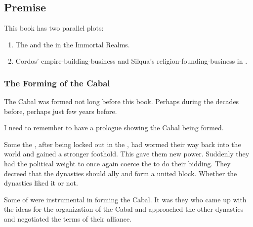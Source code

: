 \chapter{\SilquaBook}















\section{Premise}
This book has two parallel plots: 

\begin{enumerate}
  \item 
    The  and the  in the Immortal Realms. 
  \item 
    Cordos' empire-building-business and Silqua's religion-founding-business in \Azmith. 
\end{enumerate}









\subsection{The Forming of the Cabal}
The Cabal was formed not long before this book. 
Perhaps during the \CuezcanApocalypse{} decades before, perhaps just few years before. 

I need to remember to have a prologue showing the Cabal being formed. 

Some the \banelords, after being locked out in the , had wormed their way back into the world and gained a stronger foothold. 
This gave them new power. 
Suddenly they had the political weight to once again coerce the \resphain{} to do their bidding. 
They decreed that the dynasties should ally and form a united block. 
Whether the dynasties liked it or not. 

Some \resphain{} of \TiphredSerah{} were instrumental in forming the Cabal. 
It was they who came up with the ideas for the organization of the Cabal and approached the other dynasties and negotiated the terms of their alliance. 

